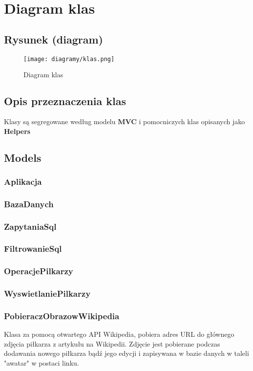 \section{Diagram klas}
\subsection{Rysunek (diagram)}
\begin{figure}[!htb]
    \centering
    \texttt{[image: diagramy/klas.png]}
    \caption{Diagram klas}                
\end{figure}

\subsection{Opis przeznaczenia klas}
    Klasy są segregowane według modelu \textbf{MVC} i pomocniczych klas opisanych jako \textbf{Helpers}

\subsection{Models}
    \subsubsection{Aplikacja}
    \subsubsection{BazaDanych}
    \subsubsection{ZapytaniaSql}
    \subsubsection{FiltrowanieSql}
    \subsubsection{OperacjePilkarzy}
    \subsubsection{WyswietlaniePilkarzy}
    \subsubsection{PobieraczObrazowWikipedia}
        Klasa za pomocą otwartego API Wikipedia, pobiera adres URL do głównego zdjęcia piłkarza z artykułu na Wikipedii. Zdjęcie jest pobierane podczas dodawania nowego piłkarza bądź jego edycji i zapisywana w bazie danych w taleli "awatar" w postaci linku.
